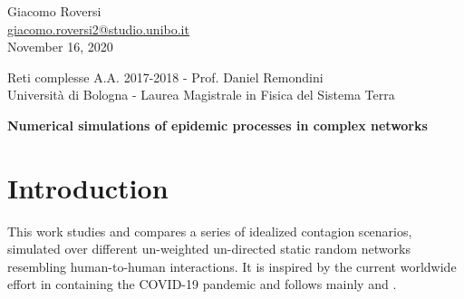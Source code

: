 \documentclass[DIV=12, BCOR=0pt]{scrartcl}  %
\begin{document}
%	
%



\begin{flushright}
	{\large Giacomo Roversi} \\ 
	{\small \href{mailto:giacomo.roversi2@studio.unibo.it}{giacomo.roversi2@studio.unibo.it} }\\
	\vskip0.15in
	{\large November 16, 2020}
\end{flushright}

\begin{flushleft}
	{\Large \color{gray}
		Reti complesse A.A. 2017-2018 - Prof. Daniel Remondini  \\
		Università di Bologna - Laurea Magistrale in Fisica del Sistema Terra}


	\vskip0.2in
	{\huge\textbf{Numerical simulations of epidemic processes in complex networks}} 
	\vskip0.33in
	
\end{flushleft}
	
	\section*{Introduction}
	\label{sec:intro}
	This work studies and compares a series of idealized contagion scenarios, simulated over different un-weighted un-directed static random networks resembling human-to-human interactions. It is inspired by the current worldwide effort in containing the COVID-19 pandemic and follows mainly \citet{Pastor-Satorras} and \citep{Firth2020}.
	
\end{document}
